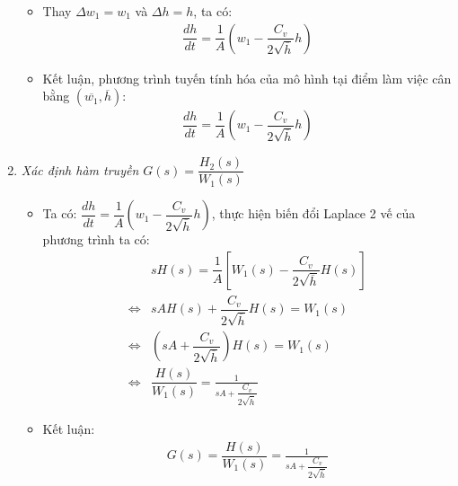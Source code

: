 \begin{enumerate}[\it a.]
\begin{itemize}
                \item Thay $\Delta w_1 = w_1$ và $\Delta h = h$, ta có:
                    \begin{align}
                        \dfrac{dh}{dt} = \dfrac{1}{A} \left({w_1 - \dfrac{C_v}{2 \sqrt{\overline{h}}} h}\right)
                    \end{align}

                \item Kết luận, phương trình tuyến tính hóa của mô hình tại điểm làm việc cân bằng $\left({\overline{w_1}, \overline{h}}\right)$:
                    \begin{align}
                        \dfrac{dh}{dt} = \dfrac{1}{A} \left({w_1 - \dfrac{C_v}{2 \sqrt{\overline{h}}} h}\right)
                    \end{align}
            \end{itemize}

        \item \textit{Xác định hàm truyền $G(s) = \dfrac{H_2(s)}{W_1(s)}$}
            \begin{itemize}
                \item Ta có: $\dfrac{dh}{dt} = \dfrac{1}{A} \left({w_1 - \dfrac{C_v}{2 \sqrt{\overline{h}}} h}\right)$, thực hiện biến đổi Laplace 2 vế của phương trình ta có:
                    \begin{align}
                        & s H(s) = \dfrac{1}{A} \left[{W_1(s) - \dfrac{C_v}{2 \sqrt{\overline{h}}} H(s)}\right]\\
                        \Longleftrightarrow & s A H(s) + \dfrac{C_v}{2 \sqrt{\overline{h}}} H(s) = W_1(s)\\
                        \Longleftrightarrow & \left({s A + \dfrac{C_v}{2 \sqrt{\overline{h}}}}\right) H(s) = W_1(s) \\
                        \Longleftrightarrow & \dfrac{H(s)}{W_1(s)} = \frac{1}{s A + \dfrac{C_v}{2 \sqrt{\overline{h}}}}
                    \end{align}

                \item Kết luận:
                    \begin{align}
                        G(s) = \dfrac{H(s)}{W_1(s)} = \frac{1}{s A + \dfrac{C_v}{2 \sqrt{\overline{h}}}}
                    \end{align}
            \end{itemize}
    \end{enumerate}

